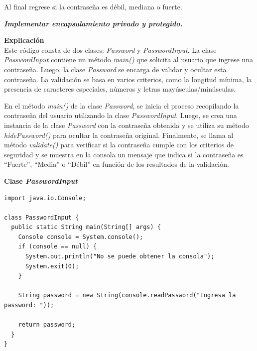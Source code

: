 \documentclass[11pt, twocolumn]{article}
\newcommand{\linejump}{\hfill \break}
\begin{document}
  Al final regrese si la contraseña es débil, mediana o fuerte.

  \textbf{\textit{Implementar encapsulamiento privado y protegido.}}

  \linejump
  \textbf{Explicación} \\
  Este código consta de dos clases: \textit{Password} y \textit{PasswordInput}. La clase \textit{PasswordInput} contiene un método \textit{main()} que solicita al usuario que ingrese una contraseña. Luego, la clase \textit{Password} se encarga de validar y ocultar esta contraseña. La validación se basa en varios criterios, como la longitud mínima, la presencia de caracteres especiales, números y letras mayúsculas/minúsculas.

  En el método \textit{main()} de la clase \textit{Password}, se inicia el proceso recopilando la contraseña del usuario utilizando la clase \textit{PasswordInput}. Luego, se crea una instancia de la clase \textit{Password} con la contraseña obtenida y se utiliza su método \textit{hidePassword()} para ocultar la contraseña original. Finalmente, se llama al método \textit{validate()} para verificar si la contraseña cumple con los criterios de seguridad y se muestra en la consola un mensaje que indica si la contraseña es ``Fuerte'', ``Media'' o ``Débil'' en función de los resultados de la validación.

  \textbf{Clase \textit{PasswordInput}}
  \begin{lstlisting}
import java.io.Console;

class PasswordInput {
  public static String main(String[] args) {
    Console console = System.console();
    if (console == null) {
      System.out.println("No se puede obtener la consola");
      System.exit(0);
    }

    String password = new String(console.readPassword("Ingresa la password: "));

    return password;
  }
}
  \end{lstlisting}
\end{document}
